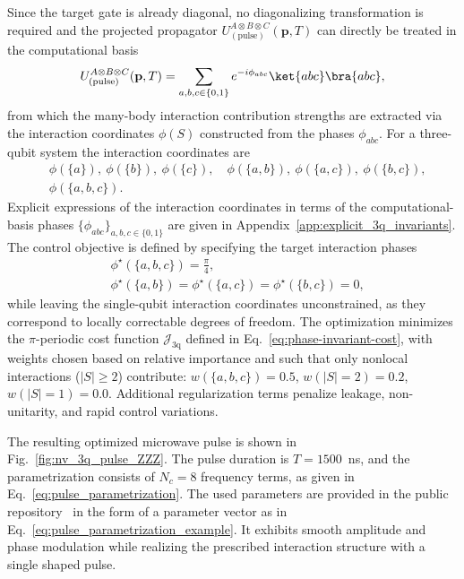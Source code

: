 \noindent
Since the target gate is already diagonal, no diagonalizing transformation is required and the projected propagator $U^{A\otimes B\otimes C}_{(\mathrm{pulse})}(\mathbf p,T)$ can directly be treated in the computational basis
\begin{equation}
U^{A\otimes B\otimes C}_{(\mathrm{pulse})}(\mathbf p,T)
=
\sum_{a,b,c\in\{0,1\}} e^{-i\phi_{abc}}\ket{abc}\bra{abc},
\label{eq:Uzzzphase}
\end{equation}
from which the many-body interaction contribution strengths are extracted via the interaction coordinates $\phi(S)$ constructed from the phases $\phi_{abc}$. For a three-qubit system the interaction coordinates are
\begin{equation}
\begin{aligned}
&\phi(\{a\}),\ \phi(\{b\}),\ \phi(\{c\}),\quad
\phi(\{a,b\}),\ \phi(\{a,c\}),\ \phi(\{b,c\}),\\
&\phi(\{a,b,c\}).
\end{aligned}
\end{equation}
Explicit expressions of the interaction coordinates in terms of the computational-basis phases $\{\phi_{abc}\}_{a,b,c\in\{0,1\}}$ are given in Appendix~\ref{app:explicit_3q_invariants}. \noindent
The control objective is defined by specifying the target interaction phases
\begin{equation}
\begin{aligned}
&\phi^\star(\{a,b,c\}) = \tfrac{\pi}{4}, \\
&\phi^\star(\{a,b\})
=
\phi^\star(\{a,c\})
=
\phi^\star(\{b,c\})
= 0,
\end{aligned}
\label{eq:Uzzzinvariants}
\end{equation}
while leaving the single-qubit interaction coordinates unconstrained, as they correspond to locally correctable degrees of freedom. The optimization minimizes the $\pi$-periodic cost function $\mathcal{J}_{\mathrm{3q}}$ defined in Eq.~\eqref{eq:phase-invariant-cost}, with weights chosen based on relative importance and such that only nonlocal interactions ($|S|\ge2$) contribute: $w(\{{a,b,c}\})=0.5$, $w(|S|=2)=0.2$, $w(|S|=1)=0.0$. Additional regularization terms penalize leakage, non-unitarity, and rapid control variations.

The resulting optimized microwave pulse is shown in Fig.~\ref{fig:nv_3q_pulse_ZZZ}. The pulse duration is $T=1500$~ns, and the parametrization consists of $N_c = 8$ frequency terms, as given in Eq.~\eqref{eq:pulse_parametrization}. The used parameters are provided in the public repository~\cite{baran2026_multiqubit_control} in the form of a parameter vector as in Eq.~\eqref{eq:pulse_parametrization_example}. It exhibits smooth amplitude and phase modulation while realizing the prescribed interaction structure with a single shaped pulse. 

